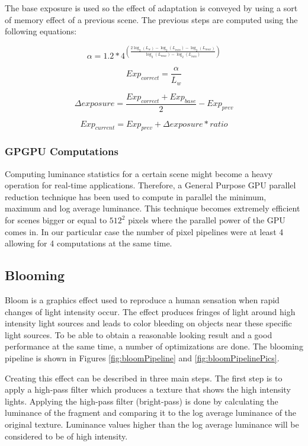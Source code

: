 \documentclass[twocolumn,8pt]{article}
\begin{document}
The base exposure is used so the effect of adaptation is conveyed by using a sort of memory effect of a previous scene.
The previous steps are computed using the following equations:

\begin{equation}
\alpha = 1.2 * 4^{\left(\frac{2\log_2(L_w) - \log_2(L_{min}) - \log_2(L_{max})}{\log_2(L_{max}) - \log_2(L_{min})}\right)}
\end{equation}

\begin{equation}
Exp_{correct} = \frac{\alpha}{\overline{L}_w}
\end{equation}

\begin{equation}
\Delta exposure = \frac{Exp_{correct} + Exp_{base}}{2} - Exp_{prev}
\end{equation}

\begin{equation}
Exp_{current} = Exp_{prev} + \Delta exposure * ratio
\end{equation}

\subsubsection{GPGPU Computations}
Computing luminance statistics for a certain scene might become a heavy operation for real-time applications. Therefore, a General Purpose GPU parallel reduction technique has been used to compute in parallel the minimum, maximum and log average luminance. This technique becomes extremely efficient for scenes bigger or equal to $512^2$ pixels where the parallel power of the GPU comes in. In our particular case the number of pixel pipelines were at least 4 allowing for 4 computations at the same time.

\subsection{Blooming}
Bloom is a graphics effect used to reproduce a human sensation when rapid changes of light intensity occur. The effect produces fringes of light around high intensity light sources and leads to color bleeding on objects near these specific light sources. To be able to obtain a reasonable looking result and a good performance at the same time, a number of optimizations are done.  The blooming pipeline is shown in Figures \ref{fig:bloomPipeline} and \ref{fig:bloomPipelinePics}.

Creating this effect can be described in three main steps. The first step is to apply a high-pass filter which produces a texture that shows the high intensity lights. Applying the high-pass filter (bright-pass) is done by calculating the luminance of the fragment and comparing it to the log average luminance of the original texture. Luminance values higher than the log average luminance will be considered to be of high intensity.
\end{document}
